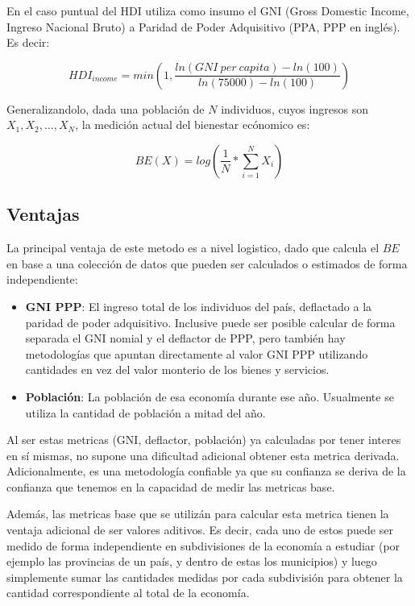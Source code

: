 En el caso puntual del HDI utiliza como insumo el GNI (Gross Domestic Income, Ingreso Nacional Bruto) a Paridad de Poder Adquisitivo (PPA, PPP en inglés). Es decir:

$$
    HDI_{income} = min(1, \frac{ln(GNI\ per\ capita) - ln(100)}{ln(75000)-ln(100)})
$$

Generalizandolo, dada una población de $N$ individuos, cuyos ingresos son $X_1, X_2, \dots, X_N$, la medición actual del bienestar ecónomico es:

$$
    BE(X) = log(\frac{1}{N} * \sum_{i=1}^{N}X_i)
$$

\subsection{Ventajas}

La principal ventaja de este metodo es a nivel logistico, dado que calcula el $BE$ en base a una colección de datos que pueden ser calculados o estimados de forma independiente:

\begin{itemize}
    \item \textbf{GNI PPP}: El ingreso total de los individuos del país, deflactado a la paridad de poder adquisitivo. Inclusive puede ser posible calcular de forma separada el GNI nomial y el deflactor de PPP, pero también hay metodologías que apuntan directamente al valor GNI PPP utilizando cantidades en vez del valor monterio de los bienes y servicios. 
    \item \textbf{Población}: La población de esa economía durante ese año. Usualmente se utiliza la cantidad de población a mitad del año.
\end{itemize}

Al ser estas metricas (GNI, deflactor, población) ya calculadas por tener interes en sí mismas, no supone una dificultad adicional obtener esta metrica derivada. Adicionalmente, es una metodología confiable ya que su confianza se deriva de la confianza que tenemos en la capacidad de medir las metricas base.

Además, las metricas base que se utilizán para calcular esta metrica tienen la ventaja adicional de ser valores aditivos. Es decir, cada uno de estos puede ser medido de forma independiente en subdivisiones de la economía a estudiar (por ejemplo las provincias de un país, y dentro de estas los municipios) y luego simplemente sumar las cantidades medidas por cada subdivisión para obtener la cantidad correspondiente al total de la economía. 


